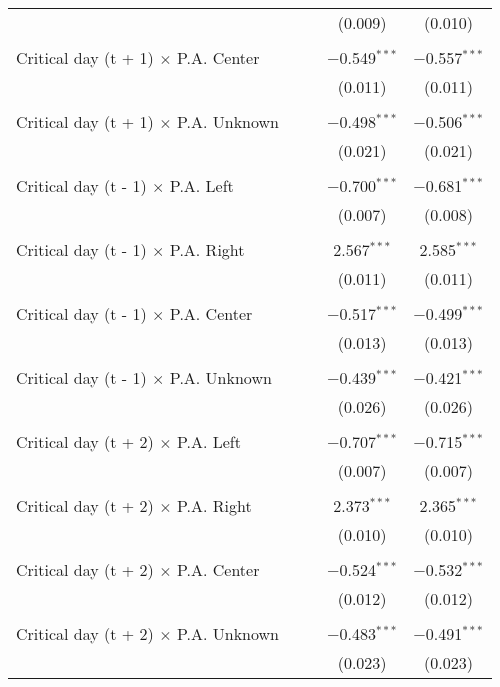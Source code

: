 \documentclass[
]{article}
\begin{document}
\begin{table}[!htbp]
{\begin{tabular}{@{\extracolsep{5pt}}lcccc}
  &  &  & (0.009) & (0.010) \\ 
  & & & & \\ 
 Critical day (t + 1) $\times$ P.A. Center &  &  & $-$0.549$^{***}$ & $-$0.557$^{***}$ \\ 
  &  &  & (0.011) & (0.011) \\ 
  & & & & \\ 
 Critical day (t + 1) $\times$ P.A. Unknown &  &  & $-$0.498$^{***}$ & $-$0.506$^{***}$ \\ 
  &  &  & (0.021) & (0.021) \\ 
  & & & & \\ 
 Critical day (t - 1) $\times$ P.A. Left &  &  & $-$0.700$^{***}$ & $-$0.681$^{***}$ \\ 
  &  &  & (0.007) & (0.008) \\ 
  & & & & \\ 
 Critical day (t - 1) $\times$ P.A. Right &  &  & 2.567$^{***}$ & 2.585$^{***}$ \\ 
  &  &  & (0.011) & (0.011) \\ 
  & & & & \\ 
 Critical day (t - 1) $\times$ P.A. Center &  &  & $-$0.517$^{***}$ & $-$0.499$^{***}$ \\ 
  &  &  & (0.013) & (0.013) \\ 
  & & & & \\ 
 Critical day (t - 1) $\times$ P.A. Unknown &  &  & $-$0.439$^{***}$ & $-$0.421$^{***}$ \\ 
  &  &  & (0.026) & (0.026) \\ 
  & & & & \\ 
 Critical day (t + 2) $\times$ P.A. Left &  &  & $-$0.707$^{***}$ & $-$0.715$^{***}$ \\ 
  &  &  & (0.007) & (0.007) \\ 
  & & & & \\ 
 Critical day (t + 2) $\times$ P.A. Right &  &  & 2.373$^{***}$ & 2.365$^{***}$ \\ 
  &  &  & (0.010) & (0.010) \\ 
  & & & & \\ 
 Critical day (t + 2) $\times$ P.A. Center &  &  & $-$0.524$^{***}$ & $-$0.532$^{***}$ \\ 
  &  &  & (0.012) & (0.012) \\ 
  & & & & \\ 
 Critical day (t + 2) $\times$ P.A. Unknown &  &  & $-$0.483$^{***}$ & $-$0.491$^{***}$ \\ 
  &  &  & (0.023) & (0.023) \\ 

\end{tabular}}
\end{table}
\end{document}
